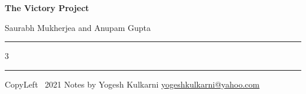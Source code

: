 \documentclass[8pt,landscape]{article}
\begin{document}
\begin{center}
     \Large{\textbf{The Victory Project}}  %
		 
		 \small{Saurabh Mukherjea and Anupam Gupta} 

\end{center}
\rule{\linewidth}{0.25pt}
\raggedright
\footnotesize
\begin{multicols}{3}




\rule{0.3\linewidth}{0.25pt}

\scriptsize
CopyLeft \textcopyleft\ 2021 Notes by Yogesh Kulkarni
\href{http://www.yogeshkulkarni.com}{yogeshkulkarni@yahoo.com}

\end{multicols}
\end{document}
